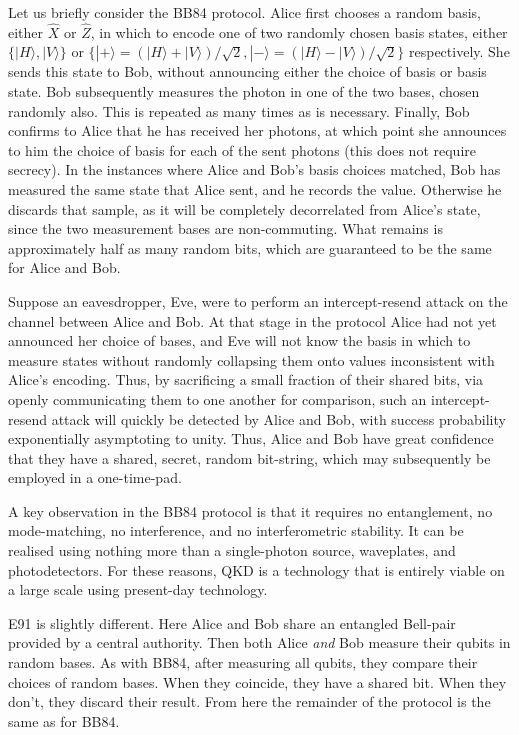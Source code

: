 \documentclass[aps,rmp,twocolumn,amsmath,amssymb,nofootinbib,superscriptaddress]{revtex4}
\newcommand{\ket}[1]{|#1\rangle}
\begin{document}
Let us briefly consider the BB84 protocol. Alice first chooses a random basis, either $\hat{X}$ or $\hat{Z}$, in which to encode one of two randomly chosen basis states, either \mbox{$\{\ket{H},\ket{V}\}$} or \mbox{$\{\ket{+}=(\ket{H}+\ket{V})/\sqrt{2},\ket{-}=(\ket{H}-\ket{V})/\sqrt{2}\}$} respectively. She sends this state to Bob, without announcing either the choice of basis or basis state. Bob subsequently measures the photon in one of the two bases, chosen randomly also. This is repeated as many times as is necessary. Finally, Bob confirms to Alice that he has received her photons, at which point she announces to him the choice of basis for each of the sent photons (this does not require secrecy). In the instances where Alice and Bob's basis choices matched, Bob has measured the same state that Alice sent, and he records the value. Otherwise he discards that sample, as it will be completely decorrelated from Alice's state, since the two measurement bases are non-commuting. What remains is approximately half as many random bits, which are guaranteed to be the same for Alice and Bob.

Suppose an eavesdropper, Eve, were to perform an intercept-resend attack on the channel between Alice and Bob. At that stage in the protocol Alice had not yet announced her choice of bases, and Eve will not know the basis in which to measure states without randomly collapsing them onto values inconsistent with Alice's encoding. Thus, by sacrificing a small fraction of their shared bits, via openly communicating them to one another for comparison, such an intercept-resend attack will quickly be detected by Alice and Bob, with success probability exponentially asymptoting to unity. Thus, Alice and Bob have great confidence that they have a shared, secret, random bit-string, which may subsequently be employed in a one-time-pad.

A key observation in the BB84 protocol is that it requires no entanglement, no mode-matching, no interference, and no interferometric stability. It can be realised using nothing more than a single-photon source, waveplates, and photodetectors. For these reasons, QKD is a technology that is entirely viable on a large scale using present-day technology.

E91 is slightly different. Here Alice and Bob share an entangled Bell-pair provided by a central authority. Then both Alice \emph{and} Bob measure their qubits in random bases. As with BB84, after measuring all qubits, they compare their choices of random bases. When they coincide, they have a shared bit. When they don't, they discard their result. From here the remainder of the protocol is the same as for BB84.
\end{document}
